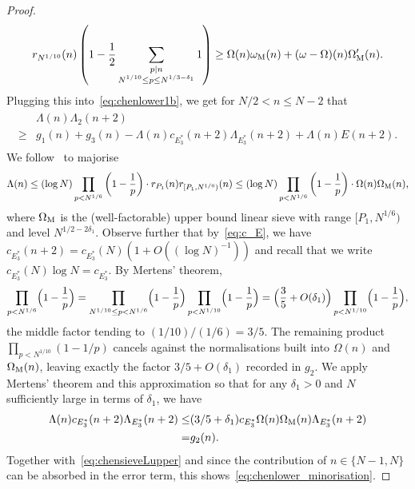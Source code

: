 \documentclass[12pt]{amsart}
\theoremstyle{definition}
\theoremstyle{remark}
\numberwithin{equation}{section}
\newcommand{\1}{\mathbf{1}}
\begin{document}
\begin{proof}
\begin{align}
     r_{N^{1/10}}(n)\left(1-\frac{1}{2}\sum_{\substack{p\mid n \\ N^{1/10}\leq p \leq N^{1/3-\delta_1}}}1\right)\geq \Omega(n)\omega_{\textnormal{M}}(n)+(\omega-\Omega)(n)\Omega'_{\textnormal{M}}(n).
    \end{align}
    Plugging this into~\eqref{eq:chenlower1b}, we get for $N/2< n \leq N-2$ that 
    \begin{align}\begin{split}\label{eq:chensieveLupper}
    &\Lambda(n)\Lambda_2(n+2)\\
    \geq& g_1(n)+g_3(n)-\Lambda(n)c_{E_3^*} (n+2)\Lambda_{E_3^*}(n+2)+\Lambda(n)E(n+2).
    \end{split}
    \end{align}
    We follow~\cite[Appendix A.4]{matomaki-shao} to majorise
    \begin{align*}
        \Lambda(n)\leq (\log N)\prod_{p<N^{1/6}}\left(1-\frac{1}{p}\right)\cdot r_{P_1}(n) r_{[P_1,N^{1/6})}(n)\leq (\log N)\prod_{p<N^{1/6}}\left(1-\frac{1}{p}\right)\cdot  \Omega (n)\Omega_{\textnormal{M}}(n),
    \end{align*}
    where $\Omega_{\textnormal{M}}$ is the (well-factorable) upper bound linear sieve with range $[P_1,N^{1/6})$ and level $N^{1/2-2 \delta_1}$.
    Observe further that by~\eqref{eq:c_E}, we have $c_{E_3^*}(n+2)=c_{E_3^*}(N)(1+O((\log N)^{-1}))$ and recall that we write $c_{E_3^*}(N) \log N=c_{E_3^*} $. By Mertens' theorem,
    \begin{align*}
        \prod_{p<N^{1/6}}\Bigl(1-\frac1p\Bigr)=\prod_{N^{1/10}\leq p<N^{1/6}}\Bigl(1-\frac1p\Bigr)\prod_{p<N^{1/10}}\Bigl(1-\frac1p\Bigr)=\Bigl(\frac35+O(\delta_1)\Bigr)\prod_{p<N^{1/10}}\Bigl(1-\frac1p\Bigr),
    \end{align*}
    the middle factor tending to $(1/10)/(1/6)=3/5$. The remaining product $\prod_{p<N^{1/10}}(1-1/p)$ cancels against the normalisations built into $\Omega(n)$ and $\Omega_{\textnormal{M}}(n)$, leaving exactly the factor $3/5+O(\delta_1)$ recorded in $g_2$. We apply Mertens' theorem and this approximation so that for any $\delta_1>0$ and $N$ sufficiently large in terms of $\delta_1$, we have
    \begin{align*}
        \Lambda(n)c_{E_3^*} (n+2)\Lambda_{E_3^*}(n+2)\leq&(3/5+\delta_1)c_{E_3^*}\Omega(n)\Omega_{\textnormal{M}}(n)\Lambda_{E_3^*}(n+2) \\
        =&g_2(n).
    \end{align*}
    Together with~\eqref{eq:chensieveLupper} and since the contribution of $n\in \{N-1,N\}$ can be absorbed in the error term, this shows~\eqref{eq:chenlower_minorisation}.


\end{proof}
\end{document}
